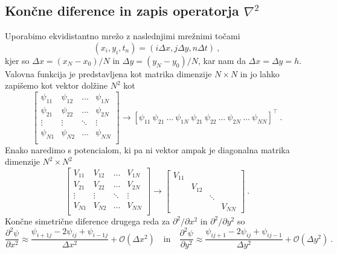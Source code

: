 \documentclass[11pt]{report}
\newcommand{\p}{\partial}
\newcommand{\pt}{\partial^2}
\newcommand{\ptx}{\partial x^2}
\newcommand{\pty}{\partial y^2}
\begin{document}
\subsection{Končne diference in zapis operatorja $\nabla^2$}
Uporabimo ekvidistantno mrežo z naslednjimi mrežnimi točami
\begin{equation}
	(x_i, y_i, t_n) = (i \Delta x, j \Delta y, n \Delta t) \>,
\end{equation}
kjer so $\Delta x = (x_N - x_0)/N$ in $\Delta y = (y_N - y_0)/N$, kar nam da $\Delta x = \Delta y = h$.
Valovna funkcija je predstavljena kot matrika dimenzije $N \times N$ in jo lahko zapišemo kot vektor
dolžine $N^2$ kot
\begin{equation}
	\label{eq: matrix psi}
	\begin{bmatrix}
		\psi_{11} & \psi_{12} & \ldots & \psi_{1N} \\
		\psi_{21} & \psi_{22} & \ldots & \psi_{2N} \\
		\vdots    & \vdots    & \ddots & \vdots    \\
		\psi_{N1} & \psi_{N2} & \dots  & \psi_{NN} \\
	\end{bmatrix}
	\rightarrow \left [ \psi_{11} \> \psi_{21} \> \dots \> \psi_{1N} \> \psi_{21} \> \psi_{22} \>
		\dots \> \psi_{2N} \> \dots \> \psi_{NN} \right ]^\top \>.
\end{equation}
Enako naredimo s potencialom, ki pa ni vektor ampak je diagonalna matrika dimenzije $N^2 \times N^2$
\begin{equation}
	\label{eq: matrix V}
	\begin{bmatrix}
		V_{11} & V_{12} & \ldots & V_{1N} \\
		V_{21} & V_{22} & \ldots & V_{2N} \\
		\vdots & \vdots & \ddots & \vdots \\
		V_{N1} & V_{N2} & \dots  & V_{NN} \\
	\end{bmatrix}
	\rightarrow
	\begin{bmatrix}
		V_{11} &        &        &        \\
		       & V_{12} &        &        \\
		       &        & \ddots &        \\
		       &        &        & V_{NN}
	\end{bmatrix} \>.
\end{equation}
Končne simetrične diference drugega reda za $\p^2 / \p x^2$ in $\p^2 / \p y^2$ so
\begin{equation}
	\label{eq: diff}
	\frac{\pt \psi}{\ptx} \approx \frac{\psi_{i+1j} - 2 \psi_{ij} + \psi_{i-1j}}{\Delta x^2} + \mathcal{O}(\Delta x^2)
	\quad \text{in} \quad
	\frac{\pt \psi}{\pty} \approx \frac{\psi_{ij+1} - 2 \psi_{ij} + \psi_{ij-1}}{\Delta y^2} + \mathcal{O}(\Delta y^2) \> .
\end{equation}
\end{document}

